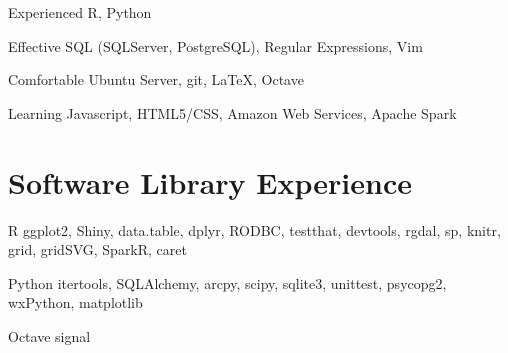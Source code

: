 \documentclass{tccv}
\begin{document}
\begin{factlist}

\item{Experienced}
     {R, Python}

\item{Effective}
     {SQL (SQLServer, PostgreSQL), Regular Expressions, Vim}
     
\item{Comfortable}
     {Ubuntu Server, git, \LaTeX, Octave}
     
\item{Learning}
     {Javascript, HTML5/CSS, Amazon Web Services, Apache Spark}

\end{factlist}

\section{Software Library Experience}

\begin{factlist}

\item{R}
     {ggplot2, Shiny, data.table, dplyr, RODBC, testthat, devtools, rgdal, sp, knitr, grid, gridSVG, SparkR, caret}

\item{Python}
     {itertools, SQLAlchemy, arcpy, scipy, sqlite3, unittest, psycopg2, wxPython, matplotlib}

\item{Octave}
     {signal}

\end{factlist}


\end{document}
